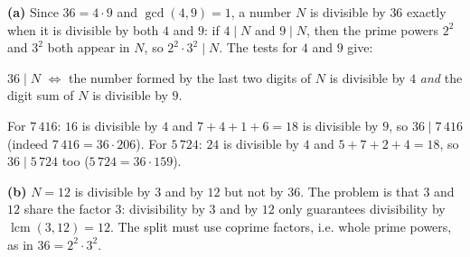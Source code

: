 \textbf{(a)} Since $36=4\cdot9$ and $\gcd(4,9)=1$, a number $N$ is divisible by $36$ exactly when it is divisible by both $4$ and $9$: if $4\mid N$ and $9\mid N$, then the prime powers $2^2$ and $3^2$ both appear in $N$, so $2^2\cdot3^2\mid N$. The tests for $4$ and $9$ give:
\begin{center}
$36\mid N$ $\iff$ the number formed by the last two digits of $N$ is divisible by $4$ \emph{and} the digit sum of $N$ is divisible by $9$.
\end{center}
For $7\,416$: $16$ is divisible by $4$ and $7+4+1+6=18$ is divisible by $9$, so $\boxed{36\mid7\,416}$ (indeed $7\,416=36\cdot206$). For $5\,724$: $24$ is divisible by $4$ and $5+7+2+4=18$, so $\boxed{36\mid5\,724}$ too ($5\,724=36\cdot159$).

\textbf{(b)} $N=12$ is divisible by $3$ and by $12$ but not by $36$. The problem is that $3$ and $12$ share the factor $3$: divisibility by $3$ and by $12$ only guarantees divisibility by $\operatorname{lcm}(3,12)=12$. The split must use coprime factors, i.e. whole prime powers, as in $36=2^2\cdot3^2$.
